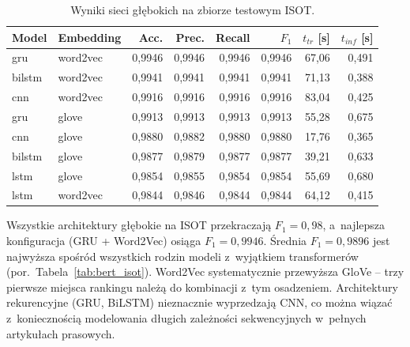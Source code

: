 \documentclass[oneside,polski,logo]{amuthesis}
\begin{document}
\begin{table}[ht]
\centering
\caption{Wyniki sieci głębokich na zbiorze testowym ISOT.}
\label{tab:dl_isot}
\begin{tabular}{llrrrrrr}
\toprule
Model & Embedding & Acc. & Prec. & Recall & $F_1$ & $t_{tr}$ [s] & $t_{inf}$ [s] \\
\midrule
gru    & word2vec & 0,9946 & 0,9946 & 0,9946 & 0,9946 & 67,06 & 0,491 \\
bilstm & word2vec & 0,9941 & 0,9941 & 0,9941 & 0,9941 & 71,13 & 0,388 \\
cnn    & word2vec & 0,9916 & 0,9916 & 0,9916 & 0,9916 & 83,04 & 0,425 \\
gru    & glove    & 0,9913 & 0,9913 & 0,9913 & 0,9913 & 55,28 & 0,675 \\
cnn    & glove    & 0,9880 & 0,9882 & 0,9880 & 0,9880 & 17,76 & 0,365 \\
bilstm & glove    & 0,9877 & 0,9879 & 0,9877 & 0,9877 & 39,21 & 0,633 \\
lstm   & glove    & 0,9854 & 0,9855 & 0,9854 & 0,9854 & 55,69 & 0,680 \\
lstm   & word2vec & 0,9844 & 0,9846 & 0,9844 & 0,9844 & 64,12 & 0,415 \\
\bottomrule
\end{tabular}
\end{table}

Wszystkie architektury głębokie na ISOT przekraczają \(F_1 = 0{,}98\),
a~najlepsza konfiguracja (GRU + Word2Vec) osiąga \(F_1 = 0{,}9946\).
Średnia \(F_1 = 0{,}9896\) jest najwyższa spośród wszystkich rodzin modeli
z~wyjątkiem transformerów (por.\ Tabela~\ref{tab:bert_isot}). Word2Vec
systematycznie przewyższa GloVe -- trzy pierwsze miejsca rankingu należą
do kombinacji z~tym osadzeniem. Architektury rekurencyjne (GRU, BiLSTM)
nieznacznie wyprzedzają CNN, co można wiązać z~koniecznością modelowania
długich zależności sekwencyjnych w~pełnych artykułach prasowych.
\end{document}
